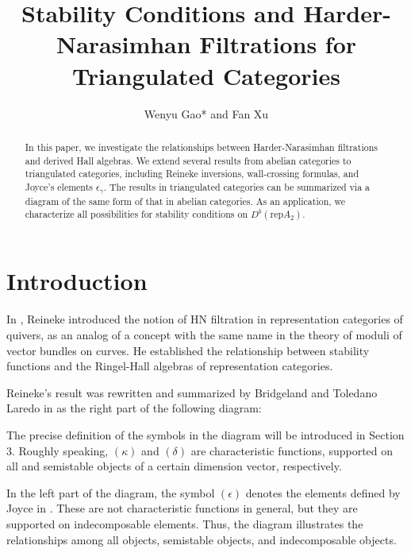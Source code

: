 \documentclass[a4paper,12pt]{amsart}
\title[Stability Conditions and HN Filtrations for Triangulated Categories]{
Stability Conditions and Harder-Narasimhan Filtrations for Triangulated Categories
}
\author[Wenyu Gao and Fan Xu]{
Wenyu Gao* and Fan Xu
}
\newcommand{\rep}{\mathrm{rep}}
\begin{document}
\begin{abstract}

In this paper, we investigate the relationships between Harder-Narasimhan filtrations and derived Hall algebras. We extend several results from abelian categories to triangulated categories, including Reineke inversions, wall-crossing formulas, and Joyce's elements $\epsilon_\gamma$. The results in triangulated categories can be summarized via a diagram of the same form of that in abelian categories. As an application, we characterize all possibilities for stability conditions on $D^b(\rep A_2)$.
\end{abstract}
\maketitle
\section{Introduction}
    In \cite{Rei2002}, Reineke introduced the notion of HN filtration in representation categories of quivers, as an analog of a concept with the same name in the theory of moduli of vector bundles on curves. He established the relationship between stability functions and the Ringel-Hall algebras of representation categories. 
    
    Reineke's result was rewritten and summarized by Bridgeland and Toledano Laredo in \cite{BT2012} as the right part of the following diagram:
    \begin{center}
\end{center}
The precise definition of the symbols in the diagram will be introduced in Section 3. Roughly speaking, $(\kappa)$ and $(\delta)$ are characteristic functions, supported on all and semistable objects of a certain dimension vector, respectively.

In the left part of the diagram, the symbol $(\epsilon)$ denotes the elements defined by Joyce in \cite{Joy2007}. These are not characteristic functions in general, but they are supported on indecomposable elements. Thus, the diagram illustrates the relationships among all objects, semistable objects, and indecomposable objects.
\end{document}
